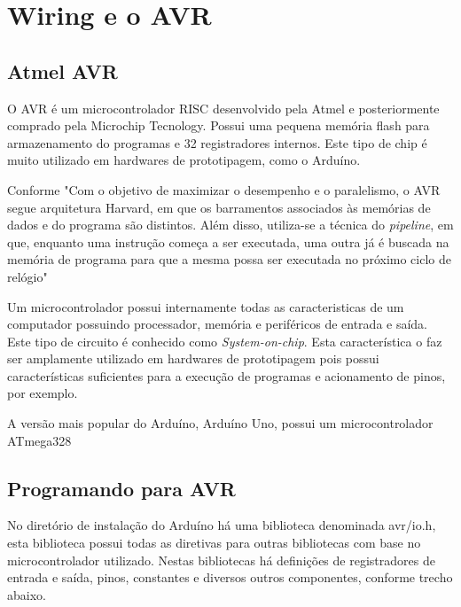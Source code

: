 \section{Wiring e o AVR}

\subsection{Atmel AVR}

O AVR é um microcontrolador RISC desenvolvido pela Atmel e posteriormente comprado pela Microchip Tecnology. Possui uma pequena memória flash para armazenamento do programas e 32 registradores internos. Este tipo de chip é muito utilizado em hardwares de prototipagem, como o Arduíno.

Conforme  "Com o objetivo de maximizar o desempenho e o paralelismo, o AVR segue arquitetura Harvard, em que os barramentos associados às memórias de dados e do programa são distintos. Além disso, utiliza-se a técnica do \emph{pipeline}, em que, enquanto uma instrução começa a ser executada, uma outra já é buscada na memória de programa para que a mesma possa ser executada no próximo ciclo de relógio"

Um microcontrolador possui internamente todas as caracteristicas de um computador possuindo processador, memória e periféricos de entrada e saída. Este tipo de circuito é conhecido como \emph{System-on-chip}. Esta característica o faz ser amplamente utilizado em hardwares de prototipagem pois possui características suficientes para a execução de programas e acionamento de pinos, por exemplo.

A versão mais popular do Arduíno, Arduíno Uno, possui um microcontrolador ATmega328

\subsection{Programando para AVR}

No diretório de instalação do Arduíno há uma biblioteca denominada avr/io.h, esta biblioteca possui todas as diretivas para outras bibliotecas com base no microcontrolador utilizado. Nestas bibliotecas há definições de registradores de entrada e saída, pinos, constantes e diversos outros componentes, conforme trecho abaixo.

